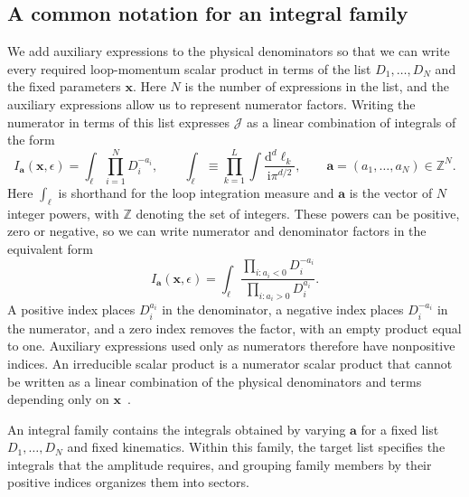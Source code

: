 \subsection{A common notation for an integral family}
We add auxiliary expressions to the physical denominators so that we can
write every required loop-momentum scalar product in terms of the list
$D_1,\ldots,D_N$ and the fixed parameters $\boldsymbol x$. Here $N$ is
the number of expressions in the list, and the auxiliary expressions
allow us to represent numerator factors. Writing the numerator in terms
of this list expresses $\mathcal J$ as a linear combination of integrals
of the form
\begin{equation}
 I_{\boldsymbol a}(\boldsymbol x,\epsilon)
 =\int_{\ell}\prod_{i=1}^{N}D_i^{-a_i},
 \qquad
 \int_{\ell}\equiv
 \prod_{k=1}^{L}\int\frac{\mathrm{d}^{d}\ell_k}{\mathrm{i}\pi^{d/2}},
 \qquad \boldsymbol a=(a_1,\ldots,a_N)\in\mathbb Z^N.
 \label{eq:family}
\end{equation}
Here $\int_\ell$ is shorthand for the loop integration measure and
$\boldsymbol a$ is the vector of $N$ integer powers, with $\mathbb Z$
denoting the set of integers. These powers can be positive, zero or
negative, so we can
write numerator and denominator factors in the equivalent form
\begin{equation}
 I_{\boldsymbol a}(\boldsymbol x,\epsilon)
 =\int_\ell
 \frac{\prod_{i:a_i<0}D_i^{-a_i}}
      {\prod_{i:a_i>0}D_i^{a_i}}.
 \label{eq:index-signs}
\end{equation}
A positive index places $D_i^{a_i}$ in the denominator, a negative index
places $D_i^{-a_i}$ in the numerator, and a zero index removes the factor,
with an empty product equal to one. Auxiliary expressions used only as
numerators therefore have nonpositive indices. An irreducible scalar
product is a numerator scalar product that cannot be written as a linear
combination of the physical denominators and terms depending only on
$\boldsymbol x$~\cite{Weinzierl2022}.

An integral family contains the integrals obtained by varying
$\boldsymbol a$ for a fixed list $D_1,\ldots,D_N$ and fixed kinematics.
Within this family, the target list specifies the integrals that the
amplitude requires, and grouping family members by their positive indices
organizes them into sectors.

